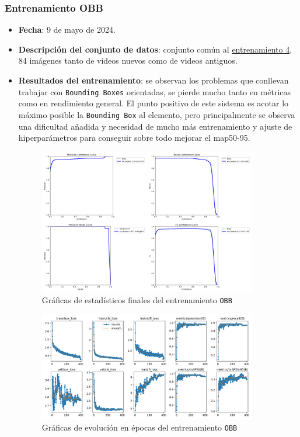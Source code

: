 \subsubsection*{Entrenamiento OBB}
\label{OBB:1}
\begin{itemize}
    \item \textbf{Fecha}: 9 de mayo de 2024.
    \item \textbf{Descripción del conjunto de datos}: conjunto común al \hyperref[train:4]{entrenamiento 4}, 84 imágenes tanto de videos nuevos como de videos antiguos.
    \item \textbf{Resultados del entrenamiento}: se observan los problemas que conllevan trabajar con \texttt{Bounding Boxes} orientadas, se pierde mucho tanto en métricas como en rendimiento general. 
    El punto positivo de este sistema es acotar lo máximo posible la \texttt{Bounding Box} al elemento, pero principalmente se observa una dificultad añadida y necesidad de mucho más entrenamiento y 
    ajuste de hiperparámetros para conseguir sobre todo mejorar el \acrshort{map}50-95.

    \begin{figure}[H]
        \centering
        \includegraphics[width=0.9\textwidth]{images/13/b/obb/graficas2.png}
        \caption{Gráficas de estadísticos finales del entrenamiento \texttt{OBB}}
        \label{fig:EstadisticosOBB}
    \end{figure}
    \begin{figure}[H]
        \centering
        \includegraphics[width=0.9\textwidth]{images/13/b/obb/results.png}
        \caption{Gráficas de evolución en épocas del entrenamiento \texttt{OBB}}
        \label{fig:ResultadosOBB}
    \end{figure}

\end{itemize}
\clearpage
